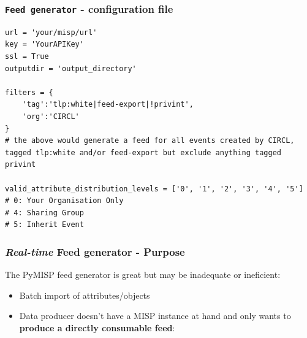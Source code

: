 \begin{frame}[fragile]
    \frametitle{\texttt{Feed generator} - configuration file}
    \begin{lstlisting}
url = 'your/misp/url'
key = 'YourAPIKey'
ssl = True
outputdir = 'output_directory'

filters = {
    'tag':'tlp:white|feed-export|!privint',
    'org':'CIRCL'
}
# the above would generate a feed for all events created by CIRCL, tagged tlp:white and/or feed-export but exclude anything tagged privint

valid_attribute_distribution_levels = ['0', '1', '2', '3', '4', '5']
# 0: Your Organisation Only
# 4: Sharing Group
# 5: Inherit Event
    \end{lstlisting}
\end{frame}

\begin{frame}
        \frametitle{{\it Real-time} Feed generator - Purpose}
    The PyMISP feed generator is great but may be inadequate or ineficient:
    \begin{itemize}
        \item Batch import of attributes/objects
        \item Data producer doesn't have a MISP instance at hand and only wants to {\bf produce a directly consumable feed}:
    \end{itemize}

    \vspace{15px}
    \begin{center}
    \end{center}
\end{frame}

